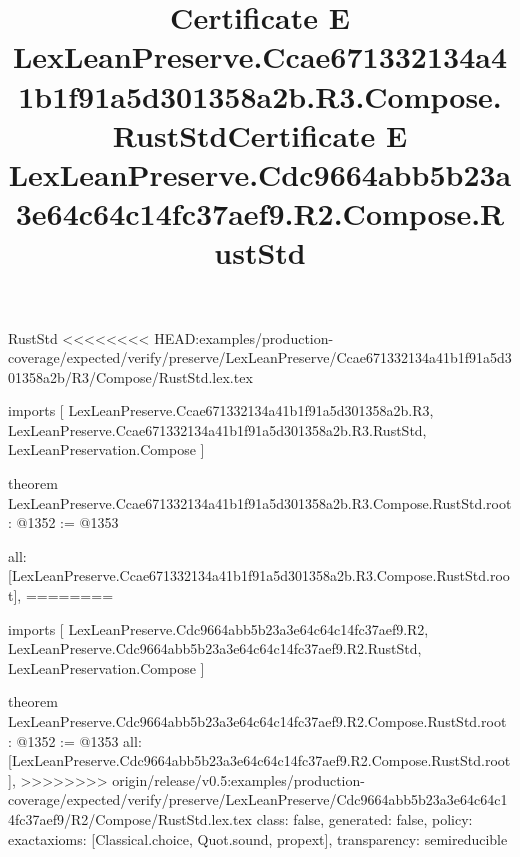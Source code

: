 \begin{lexlean}{RustStd}
<<<<<<<< HEAD:examples/production-coverage/expected/verify/preserve/LexLeanPreserve/Ccae671332134a41b1f91a5d301358a2b/R3/Compose/RustStd.lex.tex
\title{Certificate E LexLeanPreserve.Ccae671332134a41b1f91a5d301358a2b.R3.Compose.RustStd}
\begin{coremodule}
imports [
  LexLeanPreserve.Ccae671332134a41b1f91a5d301358a2b.R3,
  LexLeanPreserve.Ccae671332134a41b1f91a5d301358a2b.R3.RustStd,
  LexLeanPreservation.Compose
]

theorem LexLeanPreserve.Ccae671332134a41b1f91a5d301358a2b.R3.Compose.RustStd.root : @1352 := @1353 {
  all: [LexLeanPreserve.Ccae671332134a41b1f91a5d301358a2b.R3.Compose.RustStd.root],
========
\title{Certificate E LexLeanPreserve.Cdc9664abb5b23a3e64c64c14fc37aef9.R2.Compose.RustStd}
\begin{coremodule}
imports [
  LexLeanPreserve.Cdc9664abb5b23a3e64c64c14fc37aef9.R2,
  LexLeanPreserve.Cdc9664abb5b23a3e64c64c14fc37aef9.R2.RustStd,
  LexLeanPreservation.Compose
]

theorem LexLeanPreserve.Cdc9664abb5b23a3e64c64c14fc37aef9.R2.Compose.RustStd.root : @1352 := @1353 {
  all: [LexLeanPreserve.Cdc9664abb5b23a3e64c64c14fc37aef9.R2.Compose.RustStd.root],
>>>>>>>> origin/release/v0.5:examples/production-coverage/expected/verify/preserve/LexLeanPreserve/Cdc9664abb5b23a3e64c64c14fc37aef9/R2/Compose/RustStd.lex.tex
  class: false,
  generated: false,
  policy: exact{axioms: [Classical.choice, Quot.sound, propext]},
  transparency: semireducible
}


\end{coremodule}}
\end{coremodule}
\end{lexlean}
